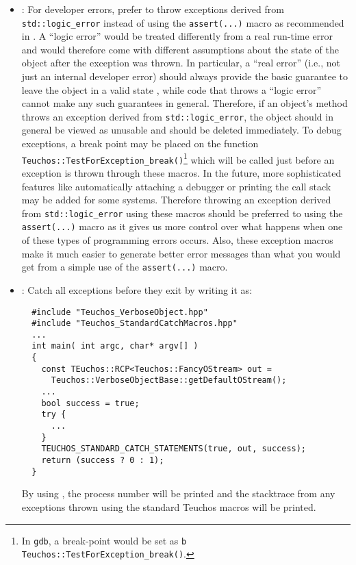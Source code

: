 \begin{itemize}

\item\GCGTestForException: For developer errors, prefer to throw
  exceptions derived from {}\texttt{std\-::logic\-\_error} instead of
  using the {}\texttt{assert(...)}  macro as recommended in
  {}\cite[Item 68]{C++CodingStandards05}.  A ``logic error'' would be
  treated differently from a real run-time error and would therefore
  come with different assumptions about the state of the object after
  the exception was thrown.  In particular, a ``real error'' (i.e.,
  not just an internal developer error) should always provide the
  basic guarantee to leave the object in a valid state \cite[Item
  71]{C++CodingStandards05}, while code that throws a ``logic error''
  cannot make any such guarantees in general.  Therefore, if an
  object's method throws an exception derived from
  \texttt{std\-::logic\-\_error}, the object should in general be
  viewed as unusable and should be deleted immediately.  To debug
  exceptions, a break point may be placed on the function
  {}\texttt{Teuchos::Test\-For\-Exception\-\_break()}\footnote{In
  {}\texttt{gdb}, a break-point would be set as {}\texttt{b
  Teuchos::Test\-For\-Exception\-\_break()}.} which will be called
  just before an exception is thrown through these macros.  In the
  future, more sophisticated features like automatically attaching a
  debugger or printing the call stack may be added for some systems.
  Therefore throwing an exception derived from
  \texttt{std\-::logic\-\_error} using these macros should be
  preferred to using the {}\texttt{assert(...)} macro as it gives us
  more control over what happens when one of these types of
  programming errors occurs.  Also, these exception macros make it
  much easier to generate better error messages than what you would
  get from a simple use of the \texttt{assert(...)} macro.

{}\item\GCGStandardCatchStatements: Catch all exceptions before they
exit {} by writing it as:

{\small\begin{verbatim}
  #include "Teuchos_VerboseObject.hpp"
  #include "Teuchos_StandardCatchMacros.hpp"
  ...
  int main( int argc, char* argv[] )
  {
    const TEuchos::RCP<Teuchos::FancyOStream> out =
      Teuchos::VerboseObjectBase::getDefaultOStream();
    ...
    bool success = true;
    try {
      ...
    } 
    TEUCHOS_STANDARD_CATCH_STATEMENTS(true, out, success);
    return (success ? 0 : 1);
  }
\end{verbatim}}

By using {}, the
process number will be printed and the stacktrace from any exceptions
thrown using the standard Teuchos macros will be printed.

\end{itemize}


